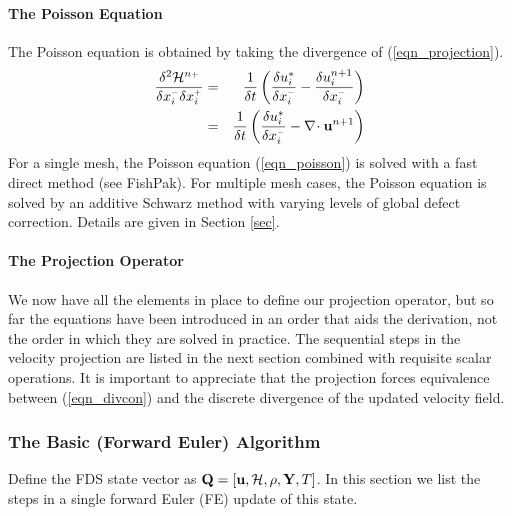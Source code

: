 \documentclass[11pt]{article}
\begin{document}
\paragraph{The Poisson Equation}

The Poisson equation is obtained by taking the divergence of (\ref{eqn_projection}).
\begin{eqnarray}
\label{eqn_poisson}
\frac{\delta^2 {\cal H}^{n{\scriptscriptstyle +}}}{\delta x_i^{\scriptscriptstyle -}\delta x_i^{\scriptscriptstyle +}} &=& \frac{1}{\delta t}\left( \frac{\delta u_i^*}{\delta x_i^{\scriptscriptstyle -}} - \frac{\delta u_i^{n+1}}{\delta x_i^{\scriptscriptstyle -}} \right) \nonumber\\
&=& \frac{1}{\delta t}\left( \frac{\delta u_i^*}{\delta x_i^{\scriptscriptstyle -}} - \nabla\!\cdot \mathbf{u}^{n+1} \right)
\end{eqnarray}
For a single mesh, the Poisson equation (\ref{eqn_poisson}) is solved with a fast direct method (see FishPak).  For multiple mesh cases, the Poisson equation is solved by an additive Schwarz method with varying levels of global defect correction.  Details are given in Section \ref{sec}.

\paragraph{The Projection Operator} We now have all the elements in place to define our projection operator, but so far the equations have been introduced in an order that aids the derivation, not the order in which they are solved in practice.  The sequential steps in the velocity projection are listed in the next section combined with requisite scalar operations.  It is important to appreciate that the projection forces equivalence between (\ref{eqn_divcon}) and the discrete divergence of the updated velocity field.


\subsubsection{The Basic (Forward Euler) Algorithm}

Define the FDS state vector as $\mathbf{Q} = [\mathbf{u},{\cal H},\rho,\mathbf{Y},T]$. In this section we list the steps in a single forward Euler (FE) update of this state.
\end{document}
